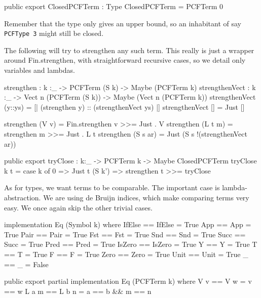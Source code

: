 \begin{code}
public export
ClosedPCFTerm : Type
ClosedPCFTerm = PCFTerm 0
\end{code}

Remember that the type only gives an upper bound, so an inhabitant of say
\lstinline{PCFType 3} might still be closed.

The following will try to strengthen any such term. This really is just a
wrapper around Fin.strengthen, with straightforward recursive cases,
so we detail only variables and lambdas.   %

\begin{code}
strengthen : {k :_} -> PCFTerm (S k) -> Maybe (PCFTerm k)
strengthenVect : {k :_} -> Vect n (PCFTerm (S k)) -> Maybe (Vect n (PCFTerm k))
strengthenVect (y::ys) = [| (strengthen y) :: (strengthenVect ys) |]
strengthenVect [] = Just []
\end{code}


\begin{code}
strengthen (V v)    = Fin.strengthen v >>= Just . V
strengthen (L t m)  = strengthen m     >>= Just . L t
strengthen (S s ar) = Just (S s !(strengthenVect ar))
\end{code}

\begin{code}
public export
tryClose : {k:_} -> PCFTerm k -> Maybe ClosedPCFTerm
tryClose {k} t = case k of
                 0      => Just t
                 (S k') => strengthen t >>= tryClose
\end{code}

As for types, we want terms to be comparable. The important case is lambda-abstraction.
We are using de Bruijn indices, which make comparing terms very easy.
We once again skip the other trivial cases.

\begin{hidden}
implementation Eq (Symbol k) where
  IfElse == IfElse = True
  App    == App    = True
  Pair   == Pair   = True
  Fst    == Fst    = True
  Snd    == Snd    = True
  Succ   == Succ   = True
  Pred   == Pred   = True
  IsZero == IsZero = True
  Y      == Y      = True
  T      == T      = True
  F      == F      = True
  Zero   == Zero   = True
  Unit   == Unit   = True
  _      == _      = False
\end{hidden}

\begin{code}
public export partial
implementation Eq (PCFTerm k) where
  V v         == V w          = v == w
  L a m       == L b n        = a == b && m == n
\end{code}

